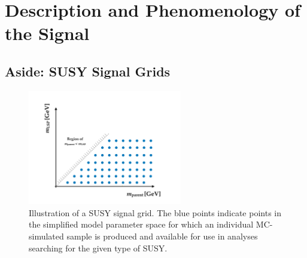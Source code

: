 \section{Description and Phenomenology of the Signal}
\label{sec:stop_pheno}




\subsection{Aside: SUSY Signal Grids}
\label{sec:susy_signal_grid}

\begin{figure}[!htb]
    \begin{center}
        \includegraphics[width=0.6\textwidth]{figures/search_stop2l/signal/susy_signal_grid_example}
        \caption{
            Illustration of a SUSY signal grid.
            The blue points indicate points in the simplified model parameter space for which
            an individual MC-simulated sample is produced and available for use in analyses
            searching for the given type of SUSY.
        }
        \label{fig:susy_signal_grid}
    \end{center}
\end{figure}

